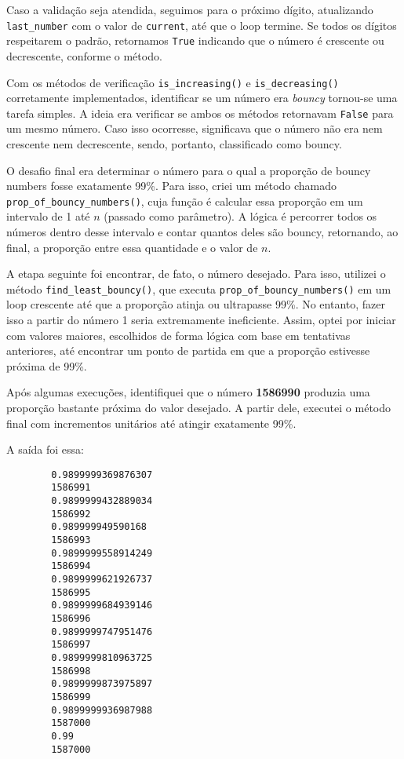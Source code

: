 \documentclass[9pt,a4paper,twocolumn,twoside]{tau-class/tau}
\begin{document}
        Caso a validação seja atendida, seguimos para o próximo dígito, atualizando \texttt{last\_number} com o valor de \texttt{current}, até que o loop termine. Se todos os dígitos respeitarem o padrão, retornamos \texttt{True} indicando que o número é crescente ou decrescente, conforme o método.

        Com os métodos de verificação \texttt{is\_increasing()} e \texttt{is\_decreasing()} corretamente implementados, identificar se um número era \textit{bouncy} tornou-se uma tarefa simples. A ideia era verificar se ambos os métodos retornavam \texttt{False} para um mesmo número. Caso isso ocorresse, significava que o número não era nem crescente nem decrescente, sendo, portanto, classificado como bouncy.

        O desafio final era determinar o número para o qual a proporção de bouncy numbers fosse exatamente 99\%. Para isso, criei um método chamado \texttt{prop\_of\_bouncy\_numbers()}, cuja função é calcular essa proporção em um intervalo de 1 até $n$ (passado como parâmetro). A lógica é percorrer todos os números dentro desse intervalo e contar quantos deles são bouncy, retornando, ao final, a proporção entre essa quantidade e o valor de $n$.
        
        A etapa seguinte foi encontrar, de fato, o número desejado. Para isso, utilizei o método \texttt{find\_least\_bouncy()}, que executa \texttt{prop\_of\_bouncy\_numbers()} em um loop crescente até que a proporção atinja ou ultrapasse 99\%. No entanto, fazer isso a partir do número 1 seria extremamente ineficiente. Assim, optei por iniciar com valores maiores, escolhidos de forma lógica com base em tentativas anteriores, até encontrar um ponto de partida em que a proporção estivesse próxima de 99\%.
        
        Após algumas execuções, identifiquei que o número \textbf{1586990} produzia uma proporção bastante próxima do valor desejado. A partir dele, executei o método final com incrementos unitários até atingir exatamente 99\%.

        A saída foi essa:

        \begin{verbatim}
        0.9899999369876307
        1586991
        0.9899999432889034
        1586992
        0.989999949590168
        1586993
        0.9899999558914249
        1586994
        0.9899999621926737
        1586995
        0.9899999684939146
        1586996
        0.9899999747951476
        1586997
        0.9899999810963725
        1586998
        0.9899999873975897
        1586999
        0.9899999936987988
        1587000
        0.99
        1587000
        \end{verbatim}


\printbibliography

\end{document}

